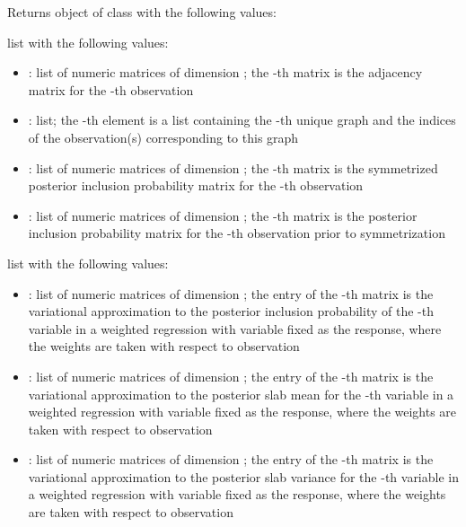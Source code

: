 \documentclass[a4paper]{book}
\begin{document}
\begin{Value}
Returns object of class  with the following values:

\begin{ldescription}
\item[\code{graphs}] list with the following values:

\begin{itemize}

\item{} : list of  numeric matrices of dimension
; the -th matrix is the adjacency matrix
for the -th observation
\item{} : list; the -th element is a list containing
the -th unique graph and the indices of the observation(s)
corresponding to this graph
\item{} : list of  numeric matrices of
dimension ; the -th matrix is the
symmetrized posterior inclusion probability matrix for the -th
observation
\item{} : list of  numeric matrices of
dimension ; the -th matrix is the
posterior inclusion probability matrix for the -th observation
prior to symmetrization

\end{itemize}



\item[\code{variational\_params}] list with the following values:

\begin{itemize}

\item{} : list of  numeric matrices of dimension
; the  entry of the
-th matrix is the variational approximation to the posterior
inclusion probability of the -th variable in a weighted
regression with variable  fixed as the response, where the
weights are taken with respect to observation 
\item{} : list of  numeric matrices of dimension
; the  entry of the
-th matrix is the variational approximation to the posterior slab
mean for the -th variable in a weighted regression with variable
 fixed as the response, where the weights are taken with respect
to observation 
\item{} : list of  numeric
matrices of dimension ; the
 entry of the -th matrix is the variational
approximation to the posterior slab variance for the -th variable
in a weighted regression with variable  fixed as the response,
where the weights are taken with respect to observation 


\end{itemize}
\end{ldescription}
\end{Value}
\end{document}
